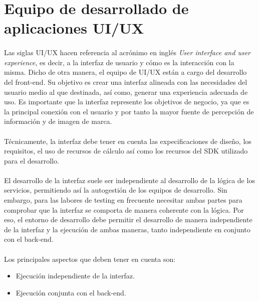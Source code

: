 \section{Equipo de desarrollado de aplicaciones UI/UX}

\paragraph{}Las siglas UI/UX hacen referencia al acrónimo en inglés \emph{User interface
and user experience}, es decir, a la interfaz de usuario y cómo es la interacción con la
misma. Dicho de otra manera, el equipo de UI/UX están a cargo del desarrollo del
\gls{front-end}. Su objetivo es crear una interfaz alineada con las necesidades del
usuario medio al que destinada, así como, generar una experiencia adecuada de uso. Es
importante que la interfaz represente los objetivos de negocio, ya que es la principal
conexión con el usuario y por tanto la mayor fuente de percepción de información y de
imagen de marca.

\paragraph{}Técnicamente, la interfaz debe tener en cuenta las expecificaciones de diseño,
los requisitos, el uso de recursos de cálculo así como los recursos del \gls{SDK}
utilizado para el desarrollo.

\paragraph{}El desarrollo de la interfaz suele ser independiente al desarrollo de la
lógica de los servicios, permitiendo así la autogestión de los equipos de desarrollo.
Sin embargo, para las labores de testing en frecuente necesitar ambas partes para
comprobar que la interfaz se comporta de manera coherente con la lógica. Por eso, el
entorno de desarrollo debe permitir el desarrollo de manera independiente de la interfaz
y la ejecución de ambas maneras, tanto independiente en conjunto con el \gls{back-end}.

\paragraph{}Los principales aspectos que deben tener en cuenta son:

\begin{itemize}
    \item Ejecución independiente de la interfaz.
    \item Ejecución conjunta con el \gls{back-end}.
\end{itemize}

